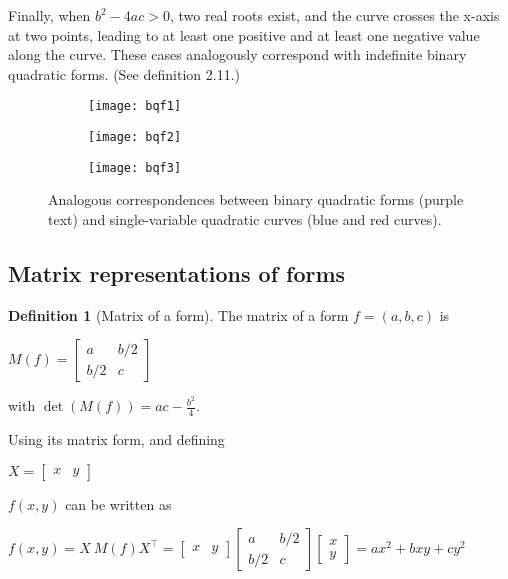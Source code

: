 \documentclass{article}
\theoremstyle{definition}
\newtheorem{definition}{Definition}[section]
\theoremstyle{theorem}
\theoremstyle{example}
\theoremstyle{corollary}
\begin{document}
\bigskip

Finally, when \(b^{2} - 4ac > 0\), two real roots exist, and the curve crosses the x-axis at two points, leading to at least one positive and at least one negative value along the curve. These cases analogously correspond with indefinite binary quadratic forms. (See definition 2.11.)

\bigskip

\begin{figure}[H]
    \centering
    \begin{subfigure}
        \centering
        \texttt{[image: bqf1]}
    \end{subfigure}
    \begin{subfigure}
        \centering
        \texttt{[image: bqf2]}
    \end{subfigure}
    \begin{subfigure}
        \centering
        \texttt{[image: bqf3]}
    \end{subfigure}    
    \caption{Analogous correspondences between binary quadratic forms (purple text) and single-variable quadratic curves (blue and red curves).}
\end{figure}







\bigskip

\subsection{Matrix representations of forms}

\bigskip

\theoremstyle{definition}
\begin{definition}[Matrix of a form]
The matrix of a form \(f = (a, b, c)\) is
\begin{center}
\(M(f) = \begin{bmatrix} a & b/2 \\ b/2 & c \end{bmatrix}\)
\end{center}
with \(\det(M(f)) = ac - \frac{b^{2}}{4}\).
\end{definition}

\bigskip

Using its matrix form, and defining
\begin{center}
\(X = \begin{bmatrix} x & y \end{bmatrix}\)
\end{center}
\(f(x, y)\) can be written as
\begin{center}
\(f(x, y) = X \ M(f) X^{\top} = \begin{bmatrix} x & y \end{bmatrix} \begin{bmatrix} a & b/2 \\ b/2 & c \end{bmatrix} \begin{bmatrix} x \\ y \end{bmatrix} = a x^{2} + b xy + c y^{2}\)
\end{center}
\end{document}
